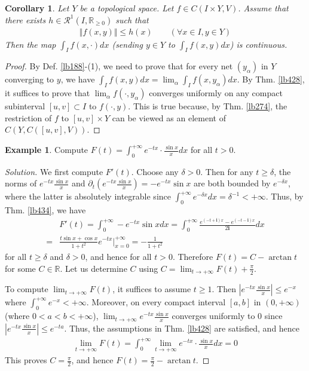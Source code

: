 \documentclass[12pt,b5paper,notitlepage]{article}
\theoremstyle{definition}
\newtheorem{eg}[df]{Example}
\theoremstyle{plain}
\newtheorem{co}[df]{Corollary}
\newcommand{\scr}{\mathscr}
\newcommand{\im}{\mathbf{i}}
\newcommand{\Rbb}{\mathbb R}
\newcommand{\dps}{\displaystyle}
\numberwithin{equation}{section}
\begin{document}
\begin{co}\label{lb429}
Let $Y$ be a topological space. Let $f\in C(I\times Y,V)$. Assume that there exists $h\in\scr R^1(I,\Rbb_{\geq0})$ such that
\begin{align}
\Vert f(x,y)\Vert\leq h(x)\qquad (\forall x\in I,y\in Y)
\end{align}
Then the map $\int_If(x,\cdot)dx$ (sending $y\in Y$ to $\int_If(x,y)dx$) is continuous.
\end{co}

\begin{proof}
By Def. \ref{lb188}-(1), we need to prove that for every net $(y_\alpha)$ in $Y$ converging to $y$, we have $\int_If(x,y)dx=\lim_\alpha\int_If(x,y_\alpha)dx$. By Thm. \ref{lb428}, it suffices to prove that $\lim_\alpha f(\cdot,y_\alpha)$ converges uniformly  on any compact subinterval $[u,v]\subset I$ to $f(\cdot,y)$. This is true because, by Thm. \ref{lb274}, the restriction of $f$ to $[u,v]\times Y$ can be viewed as an element of $C(Y,C([u,v],V))$.
\end{proof}


\begin{eg}
Compute $\dps F(t)=\int_0^{+\infty}e^{-tx}\cdot \frac{\sin x}xdx$ for all $t>0$.
\end{eg}

\begin{proof}[Solution]
We first compute $F'(t)$. Choose any $\delta>0$. Then for any $t\geq\delta$, the norms of $e^{-tx}\frac{\sin x}x$ and $\partial_t(e^{-tx}\frac{\sin x}x)=-e^{-tx}\sin x$ are both bounded by $e^{-\delta x}$, where the latter is absolutely integrable since $\int_0^{+\infty}e^{-\delta x}dx=\delta^{-1}<+\infty$. Thus, by Thm. \ref{lb434}, we have
\begin{align*}
&F'(t)=\int_0^{+\infty}-e^{-tx}\sin xdx=\int_0^{+\infty}\frac{e^{(-t+\im)x}-e^{(-t-\im)x}}{2\im}dx\\
=&\frac{t\sin x+\cos x}{1+t^2}e^{-tx}\Big|_{x=0}^{+\infty}=-\frac 1{1+t^2}
\end{align*} 
for all $t\geq\delta$ and $\delta>0$, and hence for all $t>0$. Therefore $F(t)=C-\arctan t$ for some $C\in\Rbb$. Let us determine $C$ using $C=\lim_{t\rightarrow+\infty}F(t)+\frac\pi2$. 

To compute $\lim_{t\rightarrow+\infty}F(t)$, it suffices to assume $t\geq1$. Then $|e^{-tx}\frac{\sin x}x|\leq e^{-x}$ where $\int_0^{+\infty} e^{-x}<+\infty$. Moreover, on every compact interval $[a,b]$ in $(0,+\infty)$ (where $0<a<b<+\infty$), $\lim_{t\rightarrow+\infty}e^{-tx}\frac{\sin x}x$ converges uniformly to $0$ since $|e^{-tx}\frac{\sin x}x|\leq e^{-ta}$. Thus, the assumptions in Thm. \ref{lb428} are satisfied, and hence
\begin{align*}
\lim_{t\rightarrow+\infty}F(t)=\int_0^{+\infty} \lim_{t\rightarrow +\infty}e^{-tx}\cdot \frac{\sin x}xdx=0
\end{align*}
This proves $C=\frac\pi 2$, and hence $F(t)=\frac\pi 2-\arctan t$.
\end{proof}
\end{document}
